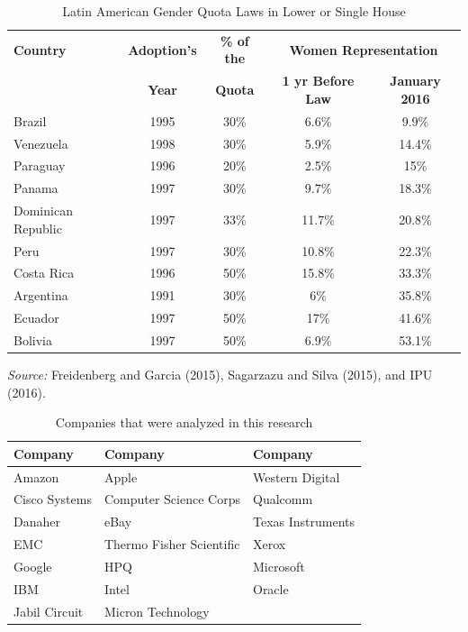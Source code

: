 \documentclass[9pt,]{book}
\begin{document}
\begin{table}[htbp!]
\centering
\caption{Latin American Gender Quota Laws in Lower or Single House \label{LAquotas}}
\begin{tabular}{lcccc} \hline\hline
\textbf{Country} & \textbf{Adoption's} & \textbf{\% of the} & \multicolumn{2}{c}{\textbf{Women Representation}}\\
 & \textbf{Year} & \textbf{Quota} & \textbf{1 yr Before Law} & \textbf{January 2016}\\
\hline
    Brazil & 1995 & 30\% & 6.6\% & 9.9\% \\
    Venezuela & 1998 & 30\% & 5.9\% & 14.4\% \\
    Paraguay & 1996 & 20\% & 2.5\% & 15\% \\
    Panama & 1997 & 30\% & 9.7\% & 18.3\% \\
    Dominican Republic & 1997 & 33\% & 11.7\% & 20.8\% \\
    Peru & 1997 & 30\% & 10.8\% & 22.3\% \\
    Costa Rica & 1996 & 50\% & 15.8\% & 33.3\% \\
    Argentina & 1991 & 30\% & 6\% & 35.8\% \\
    Ecuador & 1997 & 50\% & 17\% & 41.6\% \\
    Bolivia & 1997 & 50\% & 6.9\% & 53.1\% \\
    \hline
\end{tabular}
\begin{flushleft}
\scriptsize\emph{Source:} {Freidenberg and Garcia (2015), Sagarzazu and Silva (2015), and IPU (2016).}
\end{flushleft}
\end{table}

\begin{table}[h]
\centering
\begin{tabular}{l l l}
\hline
\textbf{Company} & \textbf{Company} & \textbf{Company} \\
\hline
Amazon & Apple & Western Digital \\
Cisco Systems & Computer Science Corps & Qualcomm \\
Danaher & eBay & Texas Instruments \\
EMC & Thermo Fisher Scientific & Xerox\\
Google & HPQ & Microsoft\\
IBM & Intel & Oracle\\
Jabil Circuit & Micron Technology \cite{Fortune} \\
\hline
\end{tabular}
\caption{Companies that were analyzed in this research}
\end{table}
\end{document}
